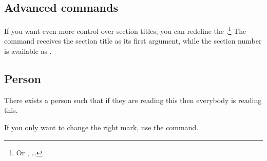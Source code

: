 \subsection{Advanced commands}

If you want even more control over section titles, you can redefine the
.\footnote{Or ,  \ldots} The
command receives the section title as its first argument, while the section
number is available as .
\begin{example}[standalone, paperheight=4.5cm, paperwidth=4cm]
\geometry{includehead, includefoot, headsep=.5em, footskip=1em} %
\sloppy %
\usepackage{fancyhdr}%
\usepackage{extramarks}%
\pagestyle{fancy}%
\fancyhead[R]{\firstleftmark}

\section{Person}
There exists a person such that
if they are reading this then
everybody is reading this.
\end{example}
If you only want to change the right mark, use the  command.


